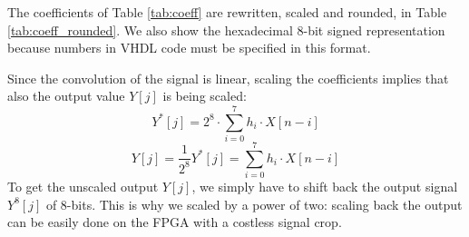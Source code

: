 The coefficients of Table \ref{tab:coeff} are rewritten, scaled and rounded, in Table \ref{tab:coeff_rounded}. We also show the hexadecimal 8-bit signed representation because numbers in VHDL code must be specified in this format.

\begin{table}[H]
    \renewcommand{\arraystretch}{1.2}
    \centering
    \caption{The FIR coefficients used as default filter specifications. The float values have been scaled by a factor of $2^8$, then rounded to the closest integer. We assume that the coefficients are symmetric, so we show only the first 4 values (out of 7 coefficients).}
    \label{tab:coeff_rounded}
\end{table}

Since the convolution of the signal is linear, scaling the coefficients implies that also the output value $Y[j]$ is being scaled:
\[ Y^*[j] = 2^8 \cdot \sum_{i=0}^{7} h_i \cdot X[n-i] \]
\[ Y[j] = \frac{1}{2^8} Y^*[j] = \sum_{i=0}^{7} h_i \cdot X[n-i] \]
To get the unscaled output $Y[j]$, we simply have to shift back the output signal $Y^8[j]$ of 8-bits. This is why we scaled by a power of two: scaling back the output can be easily done on the FPGA with a costless signal crop.



